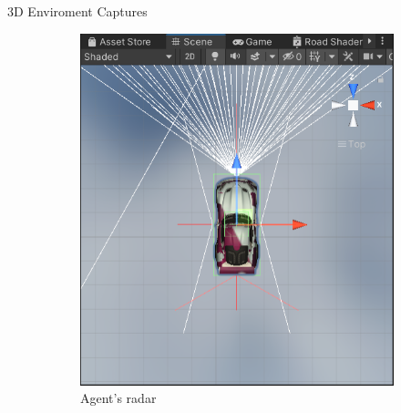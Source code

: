 \documentclass[final]{beamer}
\newlength{\twocolwid}
\begin{document}
\begin{frame}[t]
\begin{columns}[t]
\begin{column}{\twocolwid}
\begin{alertblock}{3D Enviroment Captures}
\begin{figure}
    \begin{subfigure}[bH]{0.15\textwidth}
        \includegraphics[width=\textwidth]{radar.PNG}
        \caption{Agent's radar}
        \label{fig:radar}
    \end{subfigure}
    \hfill
    \begin{subfigure}[bH]{0.15\textwidth}

\end{subfigure}
\end{figure}
\end{alertblock}
\end{column}
\end{columns}
\end{frame}
\end{document}
